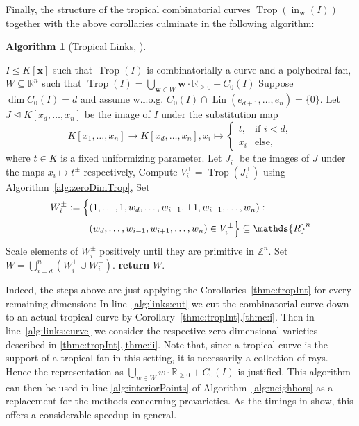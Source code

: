 \documentclass[
  paper=a4,
  titlepage,
  bibliography=totoc,
  listof=totoc,
  pagesize=pdftex
]{scrartcl}
\numberwithin{figure}{section}
\numberwithin{equation}{section}
\numberwithin{table}{section}
\newcommand*\setZ{\mathds{Z}}
\newcommand*\setR{\mathds{R}}
\let\vec\mathbf
\let\idealof\trianglelefteq
\DeclareMathOperator{\Trop}{Trop}
\DeclareMathOperator{\initial}{in}
\DeclareMathOperator{\Lin}{Lin}
\theoremstyle{definition}
\newtheorem{algo}[definition]{Algorithm}
\numberwithin{definition}{section}
\begin{document}
Finally, the structure of the tropical combinatorial curves $\Trop(\initial_{\vec w}(I))$ together
with the above corollaries culminate in the following algorithm:

\begin{algo}[Tropical Links, {\cite[Algorithm~4.5]{tropPointsLinks}}]\
  \label{alg:tropLinks}
  \begin{algorithmic}[1]
    \Require $I \idealof K[\vec x]$ such that $\Trop(I)$ is combinatorially a curve and a
    polyhedral fan,
    \Ensure $W \subseteq \setR^n$ such that $\Trop(I) = \bigcup_{\vec w \in W} \vec w
      \cdot \setR_{\geq0} + C_0(I)$
    \State Suppose $\dim C_0(I) = d$ and assume w.l.o.g. $C_0(I) \cap \Lin(e_{d+1}, \dots,
      e_n) = \{0\}$.
    \State Let $J \idealof K[x_d, \dots, x_n]$ be the image of $I$ under the substitution
      map
      \[
        K[x_1, \dots, x_n] \to K[x_d, \dots, x_n], x_i \mapsto
        \begin{cases}
          t, & \text{if } i < d, \\
          x_i & \text{else},
        \end{cases}
      \]
      where $t \in K$ is a fixed uniformizing parameter.
      \label{alg:links:cut}
      \State Let $J_i^\pm$ be the images of $J$ under the maps $x_i \mapsto t^\pm$
        respectively,
        \label{alg:links:curve}
      \State Compute $V_i^\pm = \Trop(J_i^\pm)$ using Algorithm~\ref{alg:zeroDimTrop},
      \State Set
        \begin{align*}
          W_i^\pm := \Bigl\{
            &(1, \dots, 1, w_d, \dots, w_{i-1}, \pm1, w_{i+1}, \dots, w_n) : \\
            &(w_d, \dots, w_{i-1}, w_{i+1}, \dots, w_n) \in V_i^\pm
          \Bigr\} \subseteq \setR^n
        \end{align*}
      \State Scale elements of $W_i^\pm$ positively until they are primitive in $\setZ^n$.
    \EndFor
    \State Set $W = \bigcup_{i=d}^n (W_i^+ \cup W_i^-)$.
    \State\textbf{return} $W$.
  \end{algorithmic}
\end{algo}

Indeed, the steps above are just applying the Corollaries~\ref{thmc:tropInt} for every
remaining dimension: In line~\ref{alg:links:cut} we cut the combinatorial curve down to an
actual tropical curve by Corollary~\ref{thmc:tropInt}.\ref{thmc:i}. Then in
line~\ref{alg:links:curve} we consider the respective zero-dimensional varieties described
in \ref{thmc:tropInt}.\ref{thmc:ii}. Note that, since a tropical curve is the support
of a tropical fan in this setting, it is necessarily a collection of rays. Hence the
representation as $\bigcup_{w \in W} w\cdot \setR_{\geq0} + C_0(I)$ is justified. This
algorithm can then be used in line \ref{alg:interiorPoints} of
Algorithm~\ref{alg:neighbors} as a replacement for the methods concerning prevarieties. As
the timings in \cite{tropPointsLinks} show, this offers a considerable speedup in general.
\end{document}
